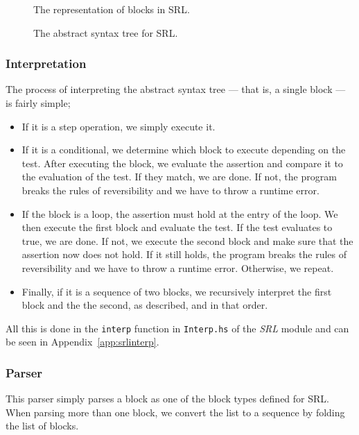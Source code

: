 \begin{figure}[H]
  
  \caption{The representation of blocks in SRL.}\label{fig:srlblock}
\end{figure}

\begin{figure}[H]
  
  \caption{The abstract syntax tree for SRL.}\label{fig:srlast}
\end{figure}


\subsubsection{Interpretation}

The process of interpreting the abstract syntax tree --- that is, a single block --- is fairly simple;\\

\begin{itemize}
  \item If it is a step operation, we simply execute it.

  \item If it is a conditional, we determine which block to execute depending on the test. After executing the block, we evaluate the assertion and compare it to the evaluation of the test. If they match, we are done. If not, the program breaks the rules of reversibility and we have to throw a runtime error.

  \item If the block is a loop, the assertion must hold at the entry of the loop. We then execute the first block and evaluate the test. If the test evaluates to true, we are done. If not, we execute the second block and make sure that the assertion now does not hold. If it still holds, the program breaks the rules of reversibility and we have to throw a runtime error. Otherwise, we repeat.

  \item Finally, if it is a sequence of two blocks, we recursively interpret the first block and the the second, as described, and in that order.
\end{itemize}

All this is done in the \texttt{interp} function in \texttt{Interp.hs} of the \textit{SRL} module and can be seen in Appendix~\ref{app:srlinterp}.

%  

\subsubsection{Parser}

This parser simply parses a block as one of the block types defined for SRL. When parsing more than one block, we convert the list to a sequence by folding the list of blocks.

